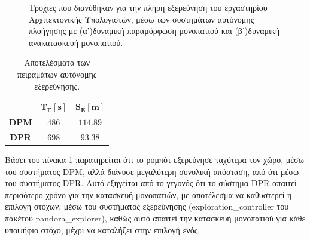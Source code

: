 \begin{figure}[!ht]
	\centering
	\hspace{0.1cm}
	\caption{Τροχιές που διανύθηκαν για την πλήρη εξερεύνηση του εργαστηρίου Αρχιτεκτονικής Υπολογιστών, μέσω των συστημάτων αυτόνομης πλοήγησης με (α')δυναμική παραμόρφωση μονοπατιού και (β')δυναμική ανακατασκευή μονοπατιού.}
	\label{fig:exploration_experiments}
\end{figure}

\bigskip
\begin{table}[!ht]
\centering
\caption{Αποτελέσματα των πειραμάτων αυτόνομης εξερεύνησης.}
\label{tab:exploration_experiments}
	\begin{tabular}{|c|c|c|}	\hline
		\cellcolor{gray} & $\mathbf{T_E[s]}$ & $\mathbf{S_E[m]}$\\ \hline
		\textbf{DPM} & $486$ & $114.89$\\ \hline
		\textbf{DPR} & $698$ & $93.38$\\ \hline
	\end{tabular}
\end{table}

Βάσει του πίνακα \ref{tab:exploration_experiments} παρατηρείται ότι το ρομπότ εξερεύνησε ταχύτερα τον χώρο, μέσω του συστήματος DPM, αλλά διάνυσε μεγαλύτερη συνολική απόσταση, από ότι μέσω του συστήματος DPR. Αυτό εξηγείται από το γεγονός ότι το σύστημα DPR απαιτεί περισότερο χρόνο για την κατασκευή μονοπατιών, με αποτέλεσμα να καθυστερεί η επιλογή στόχων, μέσω του συστήματος εξερεύνησης (exploration{\_}controller του πακέτου pandora{\_}explorer), καθώς αυτό απαιτεί την κατασκευή μονοπατιού για κάθε υποψήφιο στόχο, μέχρι να καταλήξει στην επιλογή ενός.

